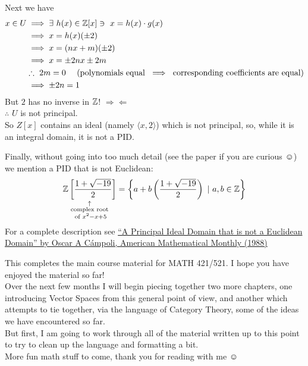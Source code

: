 Next we have
\begin{align*}
    x\in U &\implies \exists \ h(x) \in {\mathbb{Z}}[x]\ni \ x=h(x)\cdot g(x) \\
    &\implies x=h(x)(\pm 2) \\
    &\implies x=(nx+m)(\pm 2) \\
    &\implies x=\pm 2nx \pm 2m \\
    & \therefore  \ 2m =0 \ \ \ \ (\text{polynomials equal } \implies \text{ corresponding coefficients are equal})\\
    &\implies \pm 2n =1
\end{align*}
But $2$ has no inverse in ${\mathbb{Z}}$! $\Rightarrow\Leftarrow$ \\
$\therefore$ $U$ is not principal. \\

So $Z[x]$ contains an ideal (namely $\langle x,2 \rangle$) which is not principal, so, while it is
an integral domain, it is not a PID.

Finally, without going into too much detail (see the paper if you are curious $\smiley$) we mention
a PID that is not Euclidean:
\begin{align*}
    \underset{\substack{ \uparrow \\ \text{complex root} \\ \text{ of } x^2-x+5}}{{\mathbb{Z}} \left[ \frac{1+\sqrt{-19}}{2} \right] } = \left\{ a+b \left( \frac{1+\sqrt{-19}}{2} \right) \ | \ a,b \in {\mathbb{Z}} \right\}
\end{align*}
For a complete description see
\href{https://www.stat.uchicago.edu/~lekheng/courses/114s09/pidnoted.pdf}{``A Principal Ideal Domain
that is not a Euclidean Domain'' by Oscar A C\'{a}mpoli, American Mathematical Monthly (1988)}


\begin{tcolorbox}
    This completes the main course material for MATH 421/521. I hope you have enjoyed the material
    so far! \\

    Over the next few months I will begin piecing together two more chapters, one introducing Vector
    Spaces from this general point of view, and another which attempts to tie together, via the
    language of Category Theory, some of the ideas we have encountered so far. \\

    But first, I am going to work through all of the material written up to this point to try to
    clean up the language and formatting a bit. \\

    More fun math stuff to come, thank you for reading with me $\smiley$
\end{tcolorbox}


